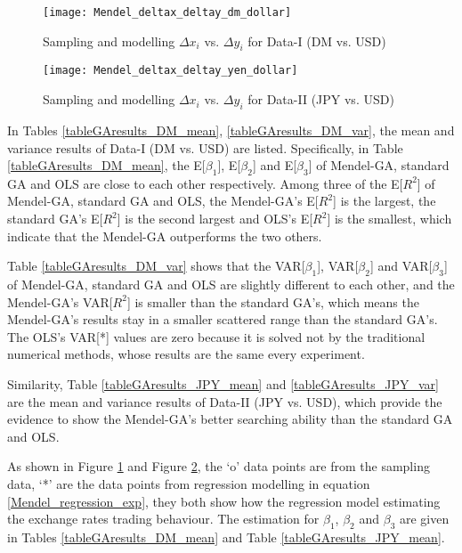 \begin{figure}[h!]
\centering
\texttt{[image: Mendel\_deltax\_deltay\_dm\_dollar]}
\caption{ Sampling and modelling $\Delta x_i$ vs. $\Delta y_i$ for
Data-I (DM vs. USD)} \label{Mendel_deltax_deltay_dm_dollar}
\end{figure}

\begin{figure}[h!]
\centering
\texttt{[image: Mendel\_deltax\_deltay\_yen\_dollar]}
\caption{Sampling and modelling $\Delta x_i$ vs. $\Delta y_i$ for
Data-II (JPY vs. USD)} \label{Mendel_deltax_deltay_yen_dollar}
\end{figure}

In Tables \ref{tableGAresults_DM_mean}, \ref{tableGAresults_DM_var},
the mean and variance results of Data-I (DM vs. USD) are listed.
Specifically, in Table \ref{tableGAresults_DM_mean}, the
E[$\beta_1$], E[$\beta_2$] and E[$\beta_3$] of Mendel-GA, standard
GA and OLS are close to each other respectively. Among three of the
E[$R^2$] of Mendel-GA, standard GA and OLS, the Mendel-GA's E[$R^2$]
is the largest, the standard GA's E[$R^2$] is the second largest and
OLS's E[$R^2$] is the smallest, which indicate that the Mendel-GA
outperforms the two others.

Table \ref{tableGAresults_DM_var} shows that the VAR[$\beta_1$],
VAR[$\beta_2$] and VAR[$\beta_3$] of Mendel-GA, standard GA and OLS
are slightly different to each other, and the Mendel-GA's VAR[$R^2$]
is smaller than the standard GA's, which means the Mendel-GA's
results stay in a smaller scattered range than the standard GA's.
The OLS's VAR[*] values are zero because it is solved not by the
traditional numerical methods, whose results are the same every
experiment.


Similarity, Table \ref{tableGAresults_JPY_mean} and
\ref{tableGAresults_JPY_var} are the mean and variance results of
Data-II (JPY vs. USD), which provide the evidence to show the
Mendel-GA's better searching ability than the standard GA and OLS.



As shown in Figure \ref{Mendel_deltax_deltay_dm_dollar} and Figure
\ref{Mendel_deltax_deltay_yen_dollar}, the `o' data points are from
the sampling data, `*' are the data points from regression modelling
in equation \ref{Mendel_regression_exp}, they both show how the
regression model estimating the exchange rates trading behaviour.
The estimation for $\beta_1$, $\beta_2$ and $\beta_3$ are given in
Tables \ref{tableGAresults_DM_mean} and Table
\ref{tableGAresults_JPY_mean}.

